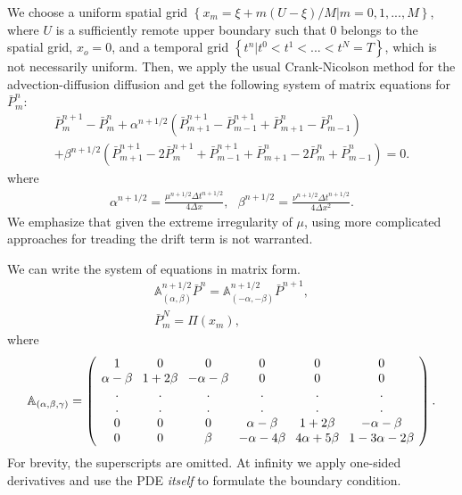 \documentclass{article}
\begin{document}
We choose a uniform spatial grid $\left\{ \left. x_{m}=\xi +m\left( U-\xi
\right) /M\right\vert m=0,1,...,M\right\} $, where $U$ is a sufficiently
remote upper boundary such that $0$ belongs to the spatial grid, $x_{o}=0$,
and a temporal grid $\left\{ \left. t^{n}\right\vert
t^{0}<t^{1}<...<t^{N}=T\right\} $, which is not necessarily uniform. Then,
we apply the usual Crank-Nicolson method for the advection-diffusion
diffusion and get the following system of matrix equations for $\bar{P}%
_{m}^{n}$:%
\begin{equation}
\begin{array}{c}
\bar{P}_{m}^{n+1}-\bar{P}_{m}^{n}+\alpha ^{n+1/2}\left( \bar{P}_{m+1}^{n+1}-%
\bar{P}_{m-1}^{n+1}+\bar{P}_{m+1}^{n}-\bar{P}_{m-1}^{n}\right) \\ 
+\beta ^{n+1/2}\left( \bar{P}_{m+1}^{n+1}-2\bar{P}_{m}^{n+1}+\bar{P}%
_{m-1}^{n+1}+\bar{P}_{m+1}^{n}-2\bar{P}_{m}^{n}+\bar{P}_{m-1}^{n}\right) =0.%
\end{array}
\label{Eq46}
\end{equation}%
where%
\begin{equation}
\begin{array}{c}
\alpha ^{n+1/2}=\frac{\mu ^{n+1/2}\Delta t^{n+1/2}}{4\Delta x},\ \ \ \beta
^{n+1/2}=\frac{\nu ^{n+1/2}\Delta t^{n+1/2}}{4\Delta x^{2}}.%
\end{array}
\label{Eq47}
\end{equation}%
We emphasize that given the extreme irregularity of $\mu $, using more
complicated approaches for treading the drift term is not warranted.

We can write the system of equations in matrix form.%
\begin{equation}
\begin{array}{c}
\mathbb{A}_{\left( \alpha ,\beta \right) }^{n+1/2}\bar{P}^{n}=\mathbb{A}%
_{\left( -\alpha ,-\beta \right) }^{n+1/2}\bar{P}^{n+1}, \\ 
\bar{P}_{m}^{N}=\Pi \left( x_{m}\right) ,%
\end{array}
\label{Eq48}
\end{equation}%
where%
\begin{equation}
\begin{array}{c}
\mathbb{A}_{\left( \alpha ,\beta ,\gamma \right) }=\left( \setlength{\arraycolsep}{4pt}
\begin{array}{cccccc}
1 & 0 & 0 & 0 & 0 & 0 \\ 
\alpha -\beta & 1+2\beta & -\alpha -\beta & 0 & 0 & 0 \\ 
. & . & . & . & . & . \\ 
. & . & . & . & . & . \\ 
0 & 0 & 0 & \alpha -\beta & 1+2\beta & -\alpha -\beta \\ 
0 & 0 & \beta & -\alpha -4\beta & 4\alpha +5\beta & 1-3\alpha -2\beta%
\end{array}%
\right) .%
\end{array}
\label{Eq49}
\end{equation}%
For brevity, the superscripts are omitted. At infinity we apply one-sided
derivatives and use the PDE \emph{itself} to formulate the boundary
condition.
\end{document}

